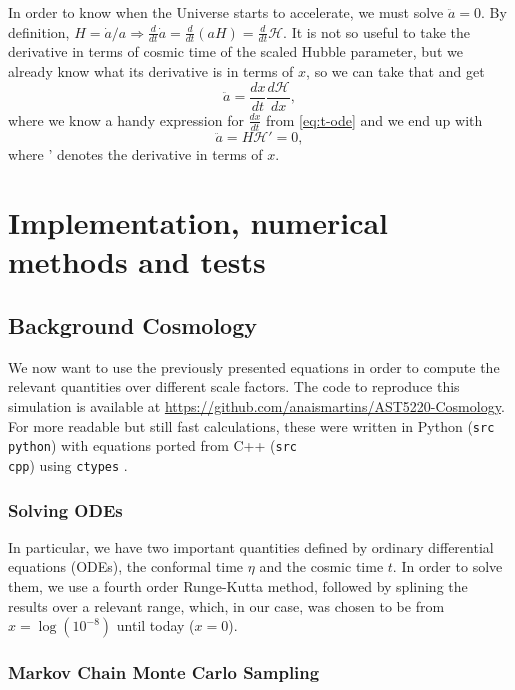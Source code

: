 \documentclass{aa}
\begin{document}
In order to know when the Universe starts to accelerate, we must solve $\ddot a = 0$. By definition, $H = \dot{a}/a \Rightarrow \frac{d}{dt} \dot a = \frac{d}{dt} (aH) = \frac{d}{dt}\mathcal H$. It is not so useful to take the derivative in terms of cosmic time of the scaled Hubble parameter, but we already know what its derivative is in terms of $x$, so we can take that and get
\begin{equation}
    \ddot a = \frac{dx}{dt}\frac{d\mathcal H}{dx},
\end{equation}
where we know a handy expression for $\frac{dx}{dt}$ from \eqref{eq:t-ode} and we end up with
\begin{equation}
    \ddot a = H\mathcal{H'} = 0,
\end{equation}
where ' denotes the derivative in terms of $x$.

\section{Implementation, numerical methods and tests}

\subsection{Background Cosmology}

We now want to use the previously presented equations in order to compute the relevant quantities over different scale factors. The code to reproduce this simulation is available at \url{https://github.com/anaismartins/AST5220-Cosmology}. For more readable but still fast calculations, these were written in Python (\texttt{src\\python}) with equations ported from C++ (\texttt{src\\cpp}) using \texttt{ctypes} \cite{ctypes}.

\subsubsection{Solving ODEs}

In particular, we have two important quantities defined by ordinary differential equations (ODEs), the conformal time $\eta$ and the cosmic time $t$. In order to solve them, we use a fourth order Runge-Kutta method, followed by splining the results over a relevant range, which, in our case, was chosen to be from $x=\log(10^{-8})$ until today ($x=0$).

\subsubsection{Markov Chain Monte Carlo Sampling}
\end{document}
